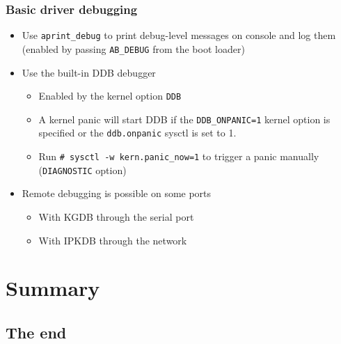 \documentclass[dvipsnames,table]{beamer}
\begin{document}
\begin{frame}
\frametitle{Basic driver debugging} 
\begin{itemize}
	\item Use {\tt aprint\_debug} to print debug-level messages on console and log them (enabled by passing {\tt AB\_DEBUG} from the boot loader)
	\item Use the built-in DDB debugger
	\begin{itemize}
			\item Enabled by the kernel option {\tt DDB}
			\item A kernel panic will start DDB if the {\tt DDB\_ONPANIC=1} kernel option is specified or the {\tt ddb.onpanic} sysctl is set to 1.
			\item Run {\tt \# sysctl -w kern.panic\_now=1} to trigger a panic manually ({\tt DIAGNOSTIC} option)
	\end{itemize}	
	\item Remote debugging is possible on some ports
	\begin{itemize}
			\item With KGDB through the serial port
			\item With IPKDB through the network
	\end{itemize}	
\end{itemize}
\end{frame}

\section{Summary}
\subsection{The end}
\end{document}
